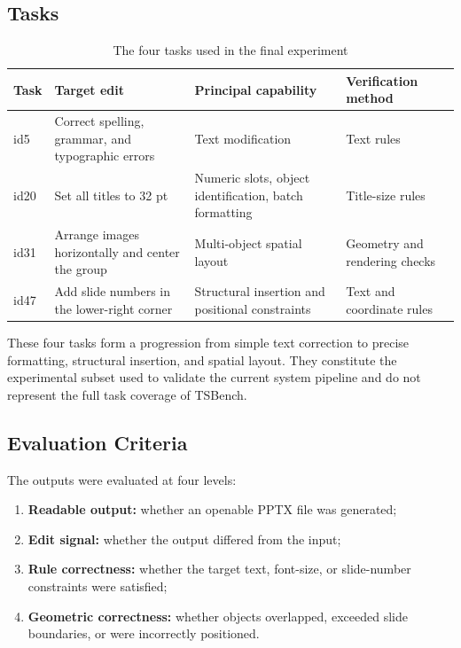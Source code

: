 \documentclass[11pt,a4paper,UTF8,fontset=fandol]{ctexart}
\begin{document}
\subsection{Tasks}

\begin{table}[H]
\centering
\caption{The four tasks used in the final experiment}
\small
\begin{tabularx}{\textwidth}{C{1.2cm} L{5.2cm} Y L{3.1cm}}
\toprule
Task & Target edit & Principal capability & Verification method \\
\midrule
id5 & Correct spelling, grammar, and typographic errors & Text modification & Text rules \\
id20 & Set all titles to 32 pt & Numeric slots, object identification, batch formatting & Title-size rules \\
id31 & Arrange images horizontally and center the group & Multi-object spatial layout & Geometry and rendering checks \\
id47 & Add slide numbers in the lower-right corner & Structural insertion and positional constraints & Text and coordinate rules \\
\bottomrule
\end{tabularx}
\end{table}

These four tasks form a progression from simple text correction to precise formatting, structural insertion, and spatial layout. They constitute the experimental subset used to validate the current system pipeline and do not represent the full task coverage of TSBench.

\subsection{Evaluation Criteria}

The outputs were evaluated at four levels:

\begin{enumerate}
  \item \textbf{Readable output:} whether an openable PPTX file was generated;
  \item \textbf{Edit signal:} whether the output differed from the input;
  \item \textbf{Rule correctness:} whether the target text, font-size, or slide-number constraints were satisfied;
  \item \textbf{Geometric correctness:} whether objects overlapped, exceeded slide boundaries, or were incorrectly positioned.
\end{enumerate}
\end{document}
